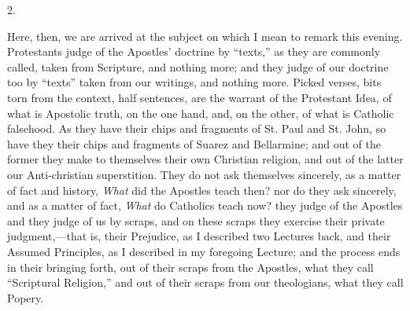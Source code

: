 2.

Here, then, we are arrived at the subject on which I
mean to remark this evening. Protestants judge of the
Apostles' doctrine by ``texts,'' as they are
commonly called, taken from Scripture, and nothing more;
and they judge of our doctrine too by ``texts''
taken from our writings, and nothing more. Picked verses,
bits torn from the context, half sentences, are the
warrant of the Protestant Idea, of what is Apostolic
truth, on the one hand, and, on the other, of what is
Catholic falsehood. As they have their chips and
fragments of St. Paul and St. John, so have they their
chips and fragments of Suarez and Bellarmine; and out of
the former they make to themselves their own Christian
religion, and out of the latter our Anti-christian
superstition. They do not ask themselves sincerely, as a
matter of fact and history, \emph{What} did the
Apostles teach then? nor do they ask sincerely, and as a
matter of fact, \emph{What} do Catholics teach now?
they judge of the Apostles and they judge of us by
scraps, and on these scraps they exercise their private judgment,—that is, their Prejudice, as I described two
Lectures back, and their Assumed Principles, as I
described in my foregoing Lecture; and the process ends
in their bringing forth, out of their scraps from the
Apostles, what they call ``Scriptural Religion,''
and out of their scraps from our theologians, what they
call Popery.

